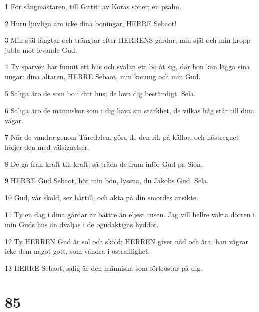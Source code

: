 \par 1 För sångmästaren, till Gittít; av Koras söner; en psalm.
\par 2 Huru ljuvliga äro icke dina boningar, HERRE Sebaot!
\par 3 Min själ längtar och trängtar efter HERRENS gårdar, min själ och min kropp jubla mot levande Gud.
\par 4 Ty sparven har funnit ett hus och svalan ett bo åt sig, där hon kan lägga sina ungar: dina altaren, HERRE Sebaot, min konung och min Gud.
\par 5 Saliga äro de som bo i ditt hus; de lova dig beständigt. Sela.
\par 6 Saliga äro de människor som i dig hava sin starkhet, de vilkas håg står till dina vägar.
\par 7 När de vandra genom Tåredalen, göra de den rik på källor, och höstregnet höljer den med välsignelser.
\par 8 De gå från kraft till kraft; så träda de fram inför Gud på Sion.
\par 9 HERRE Gud Sebaot, hör min bön, lyssna, du Jakobs Gud. Sela.
\par 10 Gud, vår sköld, ser härtill, och akta på din smordes ansikte.
\par 11 Ty en dag i dina gårdar är bättre än eljest tusen. Jag vill hellre vakta dörren i min Guds hus än dväljas i de ogudaktigas hyddor.
\par 12 Ty HERREN Gud är sol och sköld; HERREN giver nåd och ära; han vägrar icke dem något gott, som vandra i ostrafflighet.
\par 13 HERRE Sebaot, salig är den människa som förtröstar på dig.

\chapter{85}

